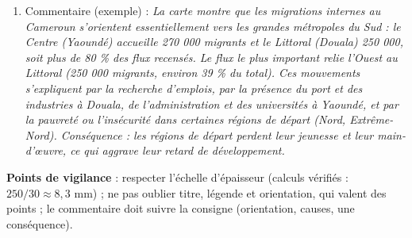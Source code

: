 \documentclass[11pt]{article}
\begin{document}
\begin{corrige}
\begin{enumerate}
\item Commentaire (exemple) : \emph{La carte montre que les migrations internes au Cameroun s'orientent essentiellement vers les grandes métropoles du Sud : le Centre (Yaoundé) accueille 270 000 migrants et le Littoral (Douala) 250 000, soit plus de 80 \% des flux recensés. Le flux le plus important relie l'Ouest au Littoral (250 000 migrants, environ 39 \% du total). Ces mouvements s'expliquent par la recherche d'emplois, par la présence du port et des industries à Douala, de l'administration et des universités à Yaoundé, et par la pauvreté ou l'insécurité dans certaines régions de départ (Nord, Extrême-Nord). Conséquence : les régions de départ perdent leur jeunesse et leur main-d'œuvre, ce qui aggrave leur retard de développement.}
\end{enumerate}
\textbf{Points de vigilance} : respecter l'échelle d'épaisseur (calculs vérifiés : $250/30 \approx 8,3$ mm) ; ne pas oublier titre, légende et orientation, qui valent des points ; le commentaire doit suivre la consigne (orientation, causes, une conséquence).
\end{corrige}
\end{document}
